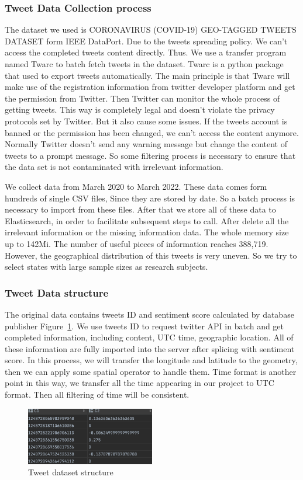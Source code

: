 \subsubsection{Tweet Data Collection process}
The dataset we used is CORONAVIRUS (COVID-19) GEO-TAGGED TWEETS DATASET form
IEEE DataPort. Due to the tweets spreading policy. We can't access the
completed tweets content directly.  Thus. We use a transfer program named
Twarc to batch fetch tweets in the dataset. Twarc is a python package
that used to export tweets automatically.  The main principle is that Twarc
will make use of the registration information from twitter developer platform
and get the permission from Twitter. Then Twitter can monitor the whole
process of getting tweets. This way is completely legal and doesn't violate
the privacy protocols set by Twitter. But it also cause some issues. If the
tweets account is banned or the permission has been changed, we can't access
the content anymore. Normally Twitter doesn't send any warning message but
change the content of tweets to a prompt message. So some filtering process
is necessary to ensure that the data set is not contaminated with irrelevant
information. 

We collect data from March 2020 to March 2022. These data comes form hundreds
of single CSV files, Since they are stored by date. So a batch process is
necessary to import from these files. After that we store all of these data
to Elasticsearch, in order to facilitate subsequent steps to call. After
delete all the irrelevant information or the missing information data. The
whole memory size up to 142Mi. The number of useful pieces of information
reaches 388,719. However, the geographical distribution of this tweets is
very uneven. So we try to select states with large sample sizes as research
subjects.

\subsubsection{Tweet Data structure}
The original data contains tweets ID and sentiment score calculated by
database publisher Figure~\ref{fig:Tweet dataset}. We use tweets ID to
request twitter API in batch and get completed information, including
content, UTC time, geographic location. All of these information are fully
imported into the server after splicing with sentiment score.  In this
process, we will transfer the longitude and latitude to the geometry, then we
can apply some spatial operator to handle them. Time format is another point
in this way, we transfer all the time appearing in our project to UTC format.
Then all filtering of time will be consistent. 
\begin{figure}[h]
\centering
\includegraphics[width=0.5\textwidth]{imgs/row_tweets.png}
\caption{Tweet dataset structure}
\label{fig:Tweet dataset}
\end{figure}
